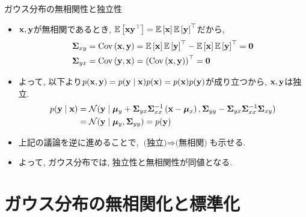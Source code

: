 \documentclass[dvipdfmx,notheorems,t]{beamer}
\begin{document}
\begin{frame}{ガウス分布の無相関性と独立性}
\begin{itemize}
  \item $\vb{x}, \vb{y}$が無相関であるとき, $\operatorname{\mathbb{E}} \left[ \vb{x} \vb{y}^\top \right] = \operatorname{\mathbb{E}} \left[ \vb{x} \right] \operatorname{\mathbb{E}} \left[ \vb{y} \right]^\top$だから,
  \begin{align*}
    \vb{\Sigma}_{xy} &= \operatorname{Cov} \left( \vb{x}, \vb{y} \right)
      = \operatorname{\mathbb{E}} \left[ \vb{x} \right] \operatorname{\mathbb{E}} \left[ \vb{y} \right]^\top - \operatorname{\mathbb{E}} \left[ \vb{x} \right] \operatorname{\mathbb{E}} \left[ \vb{y} \right]^\top = \vb{0} \\
    \vb{\Sigma}_{yx} &= \operatorname{Cov} \left( \vb{y}, \vb{x} \right) = \left( \operatorname{Cov} \left( \vb{x}, \vb{y} \right) \right)^\top = \vb{0}
  \end{align*}
  \item よって, 以下より$p(\vb{x}, \vb{y}) = p(\vb{y} \mid \vb{x}) p(\vb{x}) = p(\vb{x}) p(\vb{y})$が成り立つから,
  $\vb{x}, \vb{y}$は独立.
  \begin{align*}
    p(\vb{y} \mid \vb{x}) &= \mathcal{N}(\vb{y} \mid \vb*{\mu}_y
      + \vb{\Sigma}_{yx} \vb{\Sigma}_{xx}^{-1} \left( \vb{x} - \vb*{\mu}_x \right),
      \vb{\Sigma}_{yy} - \vb{\Sigma}_{yx} \vb{\Sigma}_{xx}^{-1} \vb{\Sigma}_{xy}) \\
    &= \mathcal{N}(\vb{y} \mid \vb*{\mu}_y, \vb{\Sigma}_{yy}) = p(\vb{y})
  \end{align*}
  \item 上記の議論を逆に進めることで, $\text{(独立)} \Longrightarrow \text{(無相関)}$も示せる.
  \item よって, ガウス分布では, 独立性と無相関性が同値となる.
\end{itemize}
\end{frame}

\section{ガウス分布の無相関化と標準化}
\end{document}
